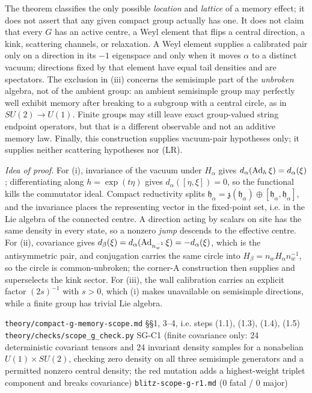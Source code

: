 \begin{scope}
The theorem classifies the only possible \emph{location} and \emph{lattice} of
a memory effect; it does not assert that any given compact group actually has
one. It does not claim that every $G$ has an active centre, a Weyl element
that flips a central direction, a kink, scattering channels, or relaxation. A
Weyl element supplies a calibrated pair only on a direction in its $-1$
eigenspace and only when it moves $\alpha$ to a distinct vacuum; directions
fixed by that element have equal tail densities and are spectators. The
exclusion in (iii) concerns the semisimple part of the \emph{unbroken}
algebra, not of the ambient group: an ambient semisimple group may perfectly
well exhibit memory after breaking to a subgroup with a central circle, as in
$SU(2)\to U(1)$. Finite groups may still leave exact group-valued string
endpoint operators, but that is a different observable and not an additive
memory law. Finally, this construction supplies vacuum-pair hypotheses only;
it supplies neither scattering hypotheses nor (LR).
\end{scope}

\emph{Idea of proof.} For (i), invariance of the vacuum under $H_\alpha$ gives
$d_\alpha(\operatorname{Ad}_h\xi)=d_\alpha(\xi)$; differentiating along $h=\exp(t\eta)$
gives $d_\alpha([\eta,\xi])=0$, so the functional kills the commutator ideal.
Compact reductivity splits
$\mathfrak{h}_\alpha=\mathfrak{z}(\mathfrak{h}_\alpha)\oplus
[\mathfrak{h}_\alpha,\mathfrak{h}_\alpha]$, and the invariance places the
representing vector in the fixed-point set, i.e. in the Lie algebra of the
connected centre. A direction acting by scalars on site has the same density
in every state, so a nonzero \emph{jump} descends to the effective centre. For
(ii), covariance gives $d_\beta(\xi)=d_\alpha(\operatorname{Ad}_{n_w^{-1}}\xi)=-d_\alpha(\xi)$,
which is the antisymmetric pair, and conjugation carries the same circle into
$H_\beta=n_wH_\alpha n_w^{-1}$, so the circle is common-unbroken; the
corner-A construction then supplies and superselects the kink sector. For
(iii), the wall calibration carries an explicit factor $(2s)^{-1}$ with $s>0$,
which (i) makes unavailable on semisimple directions, while a finite group has
trivial Lie algebra.

{\texttt{theory/compact-g-memory-scope.md} \S\S1, 3--4, i.e. steps (1.1),
 (1.3), (1.4), (1.5)}
{\texttt{theory/checks/scope\_g\_check.py} SG-C1 (finite covariance only: 24
 deterministic covariant tensors and 24 invariant density samples for a
 nonabelian $U(1)\times SU(2)$, checking zero density on all three semisimple
 generators and a permitted nonzero central density; the red mutation adds a
 highest-weight triplet component and breaks covariance)}
{\texttt{blitz-scope-g-r1.md} (0 fatal / 0 major)}

